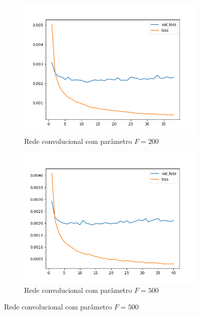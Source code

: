 \begin{figure}[p]
\begin{subfigure}{.5\textwidth}
  \label{fig:cnn-100-k-2}
\end{subfigure}
\begin{subfigure}{.5\textwidth}
  \centering
  \caption{Rede convolucional com parâmetro $F = 200$}
  \includegraphics[width=.8\linewidth]{figuras/ape-ajustes-hiper-parametros/cnn-200-k-2.png}
  
  \label{fig:cnn-200-k-2}
\end{subfigure}
\begin{subfigure}{.5\textwidth}
  \centering
  \caption{Rede convolucional com parâmetro $F = 500$}
  \includegraphics[width=.8\linewidth]{figuras/ape-ajustes-hiper-parametros/cnn-500-k-2.png}
  

\end{subfigure}
\end{figure}
